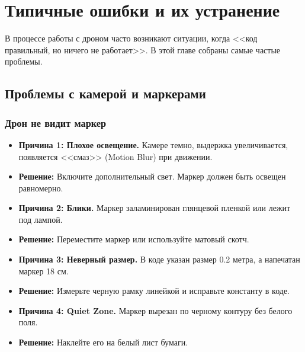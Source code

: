 \section{Типичные ошибки и их устранение}
\label{sec:python-troubleshooting}

В процессе работы с дроном часто возникают ситуации, когда <<код правильный, но ничего не работает>>. В этой главе собраны самые частые проблемы.

\subsection{Проблемы с камерой и маркерами}

\subsubsection{Дрон не видит маркер}
\begin{itemize}
    \item \textbf{Причина 1: Плохое освещение.} Камере темно, выдержка увеличивается, появляется <<смаз>> (Motion Blur) при движении.
    \item \textbf{Решение:} Включите дополнительный свет. Маркер должен быть освещен равномерно.
    
    \item \textbf{Причина 2: Блики.} Маркер заламинирован глянцевой пленкой или лежит под лампой.
    \item \textbf{Решение:} Переместите маркер или используйте матовый скотч.
    
    \item \textbf{Причина 3: Неверный размер.} В коде указан размер 0.2 метра, а напечатан маркер 18 см.
    \item \textbf{Решение:} Измерьте черную рамку линейкой и исправьте константу в коде.
    
    \item \textbf{Причина 4: Quiet Zone.} Маркер вырезан по черному контуру без белого поля.
    \item \textbf{Решение:} Наклейте его на белый лист бумаги.
\end{itemize}

